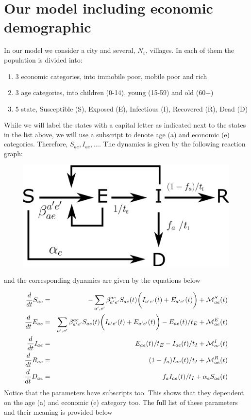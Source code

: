 \documentclass{article}
\begin{document}
\section{Our model including economic demographic}

In our model we consider a city and several, $N_v$, villages. 
In each of them the population is divided into:
\begin{enumerate}
	\item 3 economic categories, into immobile poor, mobile poor and rich
	\item 3 age categories, into children (0-14), young (15-59) and old (60+) 
	\item 5 state, Susceptible (S), Exposed (E), Infectious (I), Recovered (R), Dead (D)
\end{enumerate}

While we will label the states with a capital letter as indicated next to the states in the list above, we will use a subscript to denote age (a) and economic (e) categories. Therefore, $S_{ae}, I_{ae},...$. The dynamics is given by the following reaction graph:

\begin{figure}[H]
	\centering
	\includegraphics[width=\textwidth]{our_scheme}
\end{figure}

and the corresponding dynamics are given by the equations below

\begin{eqnarray}
\frac{d}{dt} S_{ae} &=& - \sum_{a',e'} \beta^{ae}_{a'e'} S_{ae}(t) \bigg( I_{a'e'}(t) + E_{a'e'}(t) \bigg) + \mathcal{M}^{S}_{ae}(t)\\
\frac{d}{dt} E_{ae} &=& \sum_{a',e'} \beta^{ae}_{a'e'}  S_{ae}(t) \bigg( I_{a'e'}(t) + E_{a'e'}(t) \bigg) - E_{ae}(t)/t_E + \mathcal{M}^{E}_{ae}(t)\\
\frac{d}{dt} I_{ae} &=& E_{ae}(t)/t_E - I_{ae}(t)/t_I + \mathcal{M}^{I}_{ae}(t)\\     
\frac{d}{dt} R_{ae} &=& (1- f_{a}) I_{ae}(t)/t_I  + \mathcal{M}^{R}_{ae}(t)\\
\frac{d}{dt} D_{ae} &=& f_{a} I_{ae}(t)/t_I + \alpha_e S_{ae}(t)
\end{eqnarray}
Notice that the parameters have subscripts too. This shows that they dependent on the age (a) and economic (e) category too. The full list of these parameters and their meaning is provided below 
\end{document}
